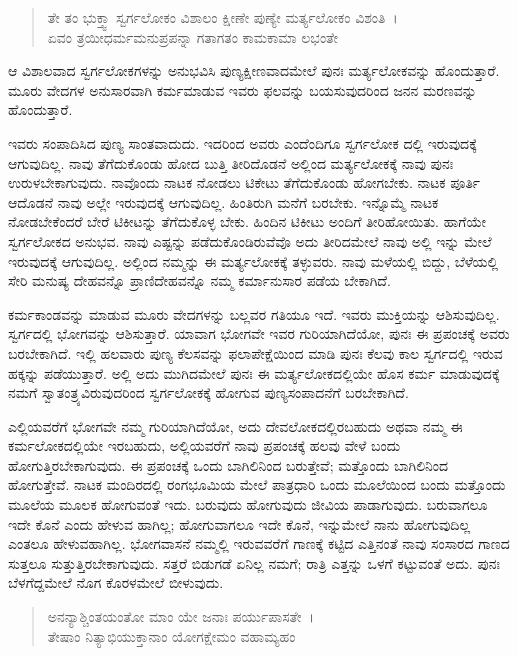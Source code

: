 \begin{verse}
ತೇ ತಂ ಭುಕ್ತ್ವಾ ಸ್ವರ್ಗಲೋಕಂ ವಿಶಾಲಂ ಕ್ಷೀಣೇ ಪುಣ್ಯೇ ಮರ್ತ್ಯಲೋಕಂ ವಿಶಂತಿ~।\\ಏವಂ ತ್ರಯೀಧರ್ಮಮನುಪ್ರಪನ್ನಾ ಗತಾಗತಂ ಕಾಮಕಾಮಾ ಲಭಂತೇ 
\end{verse}

{\small ಆ ವಿಶಾಲವಾದ ಸ್ವರ್ಗಲೋಕಗಳನ್ನು ಅನುಭವಿಸಿ ಪುಣ್ಯಕ್ಷೀಣವಾದಮೇಲೆ ಪುನಃ ಮರ್ತ್ಯಲೋಕವನ್ನು ಹೊಂದುತ್ತಾರೆ. ಮೂರು ವೇದಗಳ ಅನುಸಾರವಾಗಿ ಕರ್ಮಮಾಡುವ ಇವರು ಫಲವನ್ನು ಬಯಸುವುದರಿಂದ ಜನನ ಮರಣವನ್ನು ಹೊಂದುತ್ತಾರೆ.}

ಇವರು ಸಂಪಾದಿಸಿದ ಪುಣ್ಯ ಸಾಂತವಾದುದು. ಇದರಿಂದ ಅವರು ಎಂದೆಂದಿಗೂ ಸ್ವರ್ಗಲೋಕ ದಲ್ಲಿ ಇರುವುದಕ್ಕೆ ಆಗುವುದಿಲ್ಲ. ನಾವು ತೆಗೆದುಕೊಂಡು ಹೋದ ಬುತ್ತಿ ತೀರಿದೊಡನೆ ಅಲ್ಲಿಂದ ಮರ್ತ್ಯಲೋಕಕ್ಕೆ ನಾವು ಪುನಃ ಉರುಳಬೇಕಾಗುವುದು. ನಾವೊಂದು ನಾಟಕ ನೋಡಲು ಟಿಕೇಟು ತೆಗೆದುಕೊಂಡು ಹೋಗಬೇಕು. ನಾಟಕ ಪೂರ್ತಿ ಆದೊಡನೆ ನಾವು ಅಲ್ಲೇ ಇರುವುದಕ್ಕೆ ಆಗುವುದಿಲ್ಲ. ಹಿಂತಿರುಗಿ ಮನೆಗೆ ಬರಬೇಕು. ಇನ್ನೊಮ್ಮೆ ನಾಟಕ ನೋಡಬೇಕೆಂದರೆ ಬೇರೆ ಟಿಕೀಟನ್ನು ತೆಗೆದುಕೊಳ್ಳ ಬೇಕು. ಹಿಂದಿನ ಟಿಕೀಟು ಅಂದಿಗೆ ತೀರಿಹೋಯಿತು. ಹಾಗೆಯೇ ಸ್ವರ್ಗಲೋಕದ ಅನುಭವ. ನಾವು ಎಷ್ಟನ್ನು ಪಡೆದುಕೊಂಡಿರುವೆವೊ ಅದು ತೀರಿದಮೇಲೆ ನಾವು ಅಲ್ಲಿ ಇನ್ನು ಮೇಲೆ ಇರುವುದಕ್ಕೆ ಆಗುವುದಿಲ್ಲ. ಅಲ್ಲಿಂದ ನಮ್ಮನ್ನು ಈ ಮರ್ತ್ಯಲೋಕಕ್ಕೆ ತಳ್ಳುವರು. ನಾವು ಮಳೆಯಲ್ಲಿ ಬಿದ್ದು, ಬೆಳೆಯಲ್ಲಿ ಸೇರಿ ಮನುಷ್ಯ ದೇಹವನ್ನೊ ಪ್ರಾಣಿದೇಹವನ್ನೊ ನಮ್ಮ ಕರ್ಮಾನುಸಾರ ಪಡೆಯ ಬೇಕಾಗಿದೆ.

ಕರ್ಮಕಾಂಡವನ್ನು ಮಾಡುವ ಮೂರು ವೇದಗಳನ್ನು ಬಲ್ಲವರ ಗತಿಯೂ ಇದೆ. ಇವರು ಮುಕ್ತಿಯನ್ನು ಆಶಿಸುವುದಿಲ್ಲ. ಸ್ವರ್ಗದಲ್ಲಿ ಭೋಗವನ್ನು ಆಶಿಸುತ್ತಾರೆ. ಯಾವಾಗ ಭೋಗವೇ ಇವರ ಗುರಿಯಾಗಿದೆಯೋ, ಪುನಃ ಈ ಪ್ರಪಂಚಕ್ಕೆ ಅವರು ಬರಬೇಕಾಗಿದೆ. ಇಲ್ಲಿ ಹಲವಾರು ಪುಣ್ಯ ಕೆಲಸವನ್ನು ಫಲಾಪೇಕ್ಷೆಯಿಂದ ಮಾಡಿ ಪುನಃ ಕೆಲವು ಕಾಲ ಸ್ವರ್ಗದಲ್ಲಿ ಇರುವ ಹಕ್ಕನ್ನು ಪಡೆಯುತ್ತಾರೆ. ಅಲ್ಲಿ ಅದು ಮುಗಿದಮೇಲೆ ಪುನಃ ಈ ಮರ್ತ್ಯಲೋಕದಲ್ಲಿಯೇ ಹೊಸ ಕರ್ಮ ಮಾಡುವುದಕ್ಕೆ ನಮಗೆ ಸ್ವಾತಂತ್ರ್ಯವಿರುವುದರಿಂದ ಸ್ವರ್ಗಲೋಕಕ್ಕೆ ಹೋಗುವ ಪುಣ್ಯಸಂಪಾದನೆಗೆ ಬರಬೇಕಾಗಿದೆ.

ಎಲ್ಲಿಯವರೆಗೆ ಭೋಗವೇ ನಮ್ಮ ಗುರಿಯಾಗಿದೆಯೋ, ಅದು ದೇವಲೋಕದಲ್ಲಿರಬಹುದು ಅಥವಾ ನಮ್ಮ ಈ ಕರ್ಮಲೋಕದಲ್ಲಿಯೇ ಇರಬಹುದು, ಅಲ್ಲಿಯವರೆಗೆ ನಾವು ಪ್ರಪಂಚಕ್ಕೆ ಹಲವು ವೇಳೆ ಬಂದು ಹೋಗುತ್ತಿರಬೇಕಾಗುವುದು. ಈ ಪ್ರಪಂಚಕ್ಕೆ ಒಂದು ಬಾಗಿಲಿನಿಂದ ಬರುತ್ತೇವೆ; ಮತ್ತೊಂದು ಬಾಗಿಲಿನಿಂದ ಹೋಗುತ್ತೇವೆ. ನಾಟಕ ಮಂದಿರದಲ್ಲಿ ರಂಗಭೂಮಿಯ ಮೇಲೆ ಪಾತ್ರಧಾರಿ ಒಂದು ಮೂಲೆಯಿಂದ ಬಂದು ಮತ್ತೊಂದು ಮೂಲೆಯ ಮೂಲಕ ಹೋಗುವಂತೆ ಇದು. ಬರುವುದು ಹೋಗುವುದು ಜೀವಿಯ ಪಾಡಾಗುವುದು. ಬರುವಾಗಲೂ ಇದೇ ಕೊನೆ ಎಂದು ಹೇಳುವ ಹಾಗಿಲ್ಲ; ಹೋಗುವಾಗಲೂ ಇದೇ ಕೊನೆ, ಇನ್ನುಮೇಲೆ ನಾನು ಹೋಗುವುದಿಲ್ಲ ಎಂತಲೂ ಹೇಳುವಹಾಗಿಲ್ಲ. ಭೋಗವಾಸನೆ ನಮ್ಮಲ್ಲಿ ಇರುವವರೆಗೆ ಗಾಣಕ್ಕೆ ಕಟ್ಟಿದ ಎತ್ತಿನಂತೆ ನಾವು ಸಂಸಾರದ ಗಾಣದ ಸುತ್ತಲೂ ಸುತ್ತುತ್ತಿರಬೇಕಾಗುವುದು. ಸತ್ತರೆ ಬಿಡುಗಡೆ ಏನಿಲ್ಲ ನಮಗೆ; ರಾತ್ರಿ ಎತ್ತನ್ನು ಒಳಗೆ ಕಟ್ಟುವಂತೆ ಅದು. ಪುನಃ ಬೆಳಗೆದ್ದಮೇಲೆ ನೊಗ ಕೊರಳಮೇಲೆ ಬೀಳುವುದು.

\begin{verse}
ಅನನ್ಯಾಶ್ಚಿಂತಯಂತೋ ಮಾಂ ಯೇ ಜನಾಃ ಪರ್ಯುಪಾಸತೇ~।\\ತೇಷಾಂ ನಿತ್ಯಾಭಿಯುಕ್ತಾನಾಂ ಯೋಗಕ್ಷೇಮಂ ವಹಾಮ್ಯಹಂ 
\end{verse}

